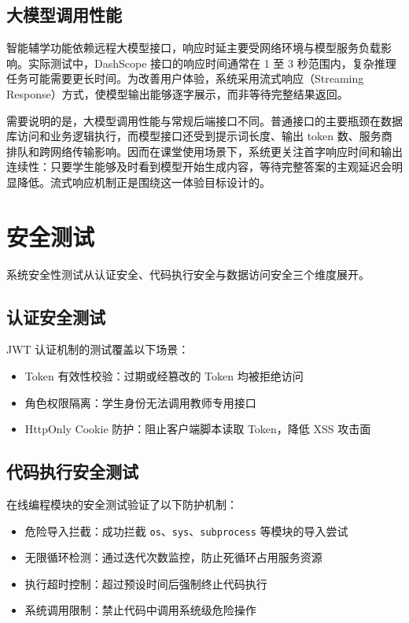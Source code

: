 \subsection{大模型调用性能}
智能辅学功能依赖远程大模型接口，响应时延主要受网络环境与模型服务负载影响。实际测试中，DashScope 接口的响应时间通常在 1 至 3 秒范围内，复杂推理任务可能需要更长时间。为改善用户体验，系统采用流式响应（Streaming Response）方式，使模型输出能够逐字展示，而非等待完整结果返回。

需要说明的是，大模型调用性能与常规后端接口不同。普通接口的主要瓶颈在数据库访问和业务逻辑执行，而模型接口还受到提示词长度、输出 token 数、服务商排队和跨网络传输影响。因而在课堂使用场景下，系统更关注首字响应时间和输出连续性：只要学生能够及时看到模型开始生成内容，等待完整答案的主观延迟会明显降低。流式响应机制正是围绕这一体验目标设计的。

\section{安全测试}
系统安全性测试从认证安全、代码执行安全与数据访问安全三个维度展开。

\subsection{认证安全测试}
JWT 认证机制的测试覆盖以下场景：
\begin{itemize}
  \item Token 有效性校验：过期或经篡改的 Token 均被拒绝访问
  \item 角色权限隔离：学生身份无法调用教师专用接口
  \item HttpOnly Cookie 防护：阻止客户端脚本读取 Token，降低 XSS 攻击面
\end{itemize}

\subsection{代码执行安全测试}
在线编程模块的安全测试验证了以下防护机制：
\begin{itemize}
  \item 危险导入拦截：成功拦截 \texttt{os}、\texttt{sys}、\texttt{subprocess} 等模块的导入尝试
  \item 无限循环检测：通过迭代次数监控，防止死循环占用服务资源
  \item 执行超时控制：超过预设时间后强制终止代码执行
  \item 系统调用限制：禁止代码中调用系统级危险操作
\end{itemize}

